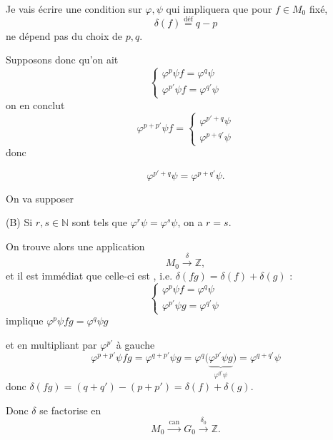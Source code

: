 \documentclass[11pt,a4paper]{article}
\begin{document}

Je vais écrire une condition sur $\varphi,\psi$ qui impliquera que pour
$f \in M_0$ fixé,
\[
  \delta(f) \overset{\text{déf}}{=} q - p
\]
ne dépend pas du choix de $p,q$.


Supposons donc qu'on ait
\[
  \begin{cases}
    \varphi^{p}\psi f = \varphi^{q}\psi \\
    \varphi^{p'}\psi f = \varphi^{q'}\psi
  \end{cases}
\]
on en conclut
\[
  \varphi^{p+p'}\psi f =
  \begin{cases}
    \varphi^{p'+q}\psi \\
    \varphi^{p+q'}\psi
  \end{cases}
\]
donc


\[
  \varphi^{p'+q}\psi = \varphi^{p+q'}\psi .
\]


On va supposer

(B) Si $r,s \in \mathbb{N}$ sont tels que $\varphi^{r}\psi = \varphi^{s}\psi$, on a $r = s$.

On trouve alors une application
\[
  M_0 \xrightarrow{\ \delta\ } \mathbb{Z} ,
\]
et il est immédiat que celle-ci est , i.e.
$\delta(fg) = \delta(f) + \delta(g)$ :
\[
  \begin{cases}
    \varphi^{p}\psi f = \varphi^{q}\psi \\
    \varphi^{p'}\psi g = \varphi^{q'}\psi
  \end{cases}
\]
implique $\varphi^{p}\psi fg = \varphi^{q}\psi g$


et en multipliant par $\varphi^{p'}$ à gauche
\[
  \varphi^{p+p'}\psi fg = \varphi^{q+p'}\psi g
  = \varphi^{q}\bigl(\underbrace{\varphi^{p'}\psi g}_{\varphi^{q'}\psi}\bigr)
  = \varphi^{q+q'}\psi
\]
donc $\delta(fg) = (q+q') - (p+p') = \delta(f) + \delta(g)$.

Donc $\delta$ se factorise en
\[
  M_0 \xrightarrow{\ \mathrm{can}\ } G_0 \xrightarrow{\ \delta_0\ } \mathbb{Z} .
\]
\end{document}
